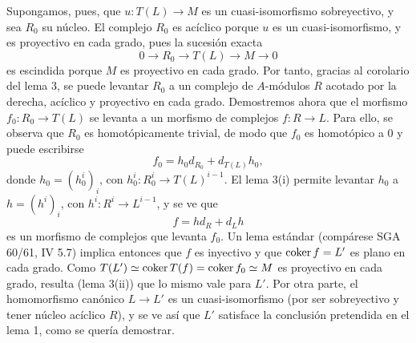 Supongamos, pues, que $u:T(L)\to M$ es un cuasi-isomorfismo sobreyectivo, y sea $R_0$ su núcleo. El complejo $R_0$ es acíclico porque $u$ es un cuasi-isomorfismo, y es proyectivo en cada grado, pues la sucesión exacta
\[
0\longrightarrow R_0\longrightarrow T(L)\longrightarrow M\longrightarrow0
\]
es escindida porque $M$ es proyectivo en cada grado. Por tanto, gracias al corolario del lema 3, se puede levantar $R_0$ a un complejo de $A$-módulos $R$ acotado por la derecha, acíclico y proyectivo en cada grado. Demostremos ahora que el morfismo $f_0:R_0\to T(L)$ se levanta a un morfismo de complejos $f:R\to L$. Para ello, se observa que $R_0$ es homotópicamente trivial, de modo que $f_0$ es homotópico a $0$ y puede escribirse
\[
f_0=h_0d_{R_0}+d_{T(L)}h_0,
\]
donde $h_0=(h_0^i)_i$, con $h_0^i:R_0^i\to T(L)^{i-1}$. El lema 3(i) permite levantar $h_0$ a $h=(h^i)_i$, con $h^i:R^i\to L^{i-1}$, y se ve que
\[
f=hd_R+d_Lh
\]
es un morfismo de complejos que levanta $f_0$. Un lema estándar (compárese SGA 60/61, IV 5.7) implica entonces que $f$ es inyectivo y que $\operatorname{coker} f=L'$ es plano en cada grado. Como $T(L')\simeq\operatorname{coker} T(f)=\operatorname{coker} f_0\simeq M$ es proyectivo en cada grado, resulta (lema 3(ii)) que lo mismo vale para $L'$. Por otra parte, el homomorfismo canónico $L\to L'$ es un cuasi-isomorfismo (por ser sobreyectivo y tener núcleo acíclico $R$), y se ve así que $L'$ satisface la conclusión pretendida en el lema 1, como se quería demostrar.
